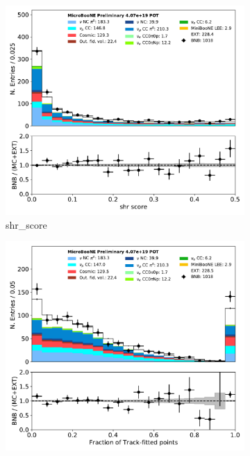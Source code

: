 \documentclass[a4paper]{article}
\begin{document}
\begin{figure}[H] 
\begin{center}
    \begin{subfigure}[b]{0.3\textwidth}
    \centering
    \includegraphics[width=1.00\textwidth]{1eNp/dataMCRun1/shr_score01152020.pdf}
    \caption{\label{fig:1eNp:dataMCRun1:shr_score} shr\_score }
    \end{subfigure}
    \begin{subfigure}[b]{0.3\textwidth}
    \centering
    \includegraphics[width=1.00\textwidth]{1eNp/dataMCRun1/trkfit01152020.pdf}

\end{subfigure}
\end{center}
\end{figure}
\end{document}
